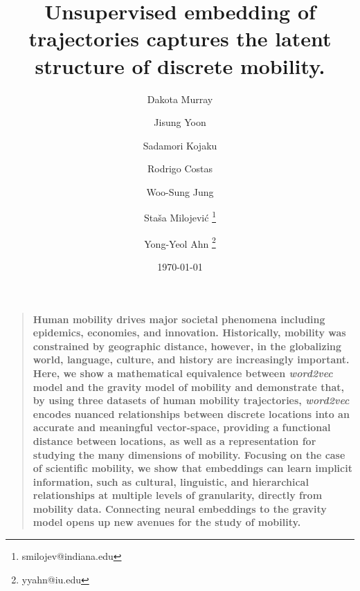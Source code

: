 \documentclass[12pt]{article} %
\newenvironment{sciabstract}{%
\begin{quote} \bf}
{\end{quote}}
\begin{document}
\title{Unsupervised embedding of trajectories captures the latent structure of discrete mobility.} %
\author[1,\Yinyang]{Dakota Murray}
\author[1,2,3,\Yinyang]{Jisung Yoon}
\author[1, \Yinyang]{Sadamori Kojaku}
\author[4,5]{Rodrigo Costas}
\author[6,7]{Woo-Sung Jung}
\author[1]{Staša Milojević \thanks{smilojev@indiana.edu}}
\author[1,8,9]{Yong-Yeol Ahn \thanks{yyahn@iu.edu}}



\date{\today}


\baselineskip24pt


\maketitle %

%
%
\newpage
\begin{sciabstract}
	Human mobility drives major societal phenomena including epidemics, economies, and innovation.
	Historically, mobility was constrained by geographic distance, however, in the globalizing world, language, culture, and history are increasingly important.
	Here, we show a mathematical equivalence between \textit{word2vec} model and the gravity model of mobility and demonstrate that, by using three datasets of human mobility trajectories, \textit{word2vec} encodes nuanced relationships between discrete locations into an accurate and meaningful vector-space, providing a functional distance between locations, as well as a representation for studying the many dimensions of mobility.
	Focusing on the case of scientific mobility, we show that embeddings can learn implicit information,  such as cultural, linguistic, and hierarchical relationships at multiple levels of granularity,  directly from mobility data.
	Connecting neural embeddings to the gravity model opens up new avenues for the study of mobility.
\end{sciabstract}
\end{document}
